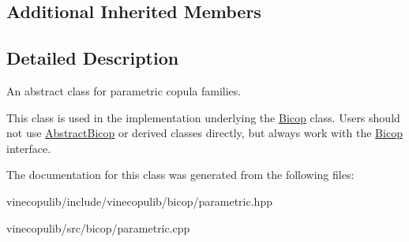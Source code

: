 \subsection*{Additional Inherited Members}


\subsection{Detailed Description}
An abstract class for parametric copula families. 

This class is used in the implementation underlying the \hyperlink{classvinecopulib_1_1_bicop}{Bicop} class. Users should not use \hyperlink{classvinecopulib_1_1_abstract_bicop}{Abstract\+Bicop} or derived classes directly, but always work with the \hyperlink{classvinecopulib_1_1_bicop}{Bicop} interface. 

The documentation for this class was generated from the following files\+:\begin{DoxyCompactItemize}
\item 
vinecopulib/include/vinecopulib/bicop/parametric.\+hpp\item 
vinecopulib/src/bicop/parametric.\+cpp\end{DoxyCompactItemize}
